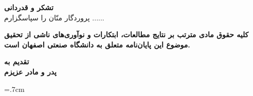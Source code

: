 \thispagestyle{empty}
\vspace*{3cm}

{\large
	\textbf{تشکر و قدردانی}\\

	
پروردگار منّان را سپاسگزارم ......

}
\restoregeometry
\pagebreak

\thispagestyle{empty}

\begin{spacing}{3}
	\leavevmode
	\vfill
	\parbox{8 cm}{
		
		\textbf{\Large کلیه حقوق مادی مترتب بر نتایج مطالعات، ابتکارات و نوآوری‌های ناشی از تحقیق موضوع این پایان‌نامه متعلق به دانشگاه صنعتی اصفهان است.}
		
	}
	\vfill
\end{spacing}
\restoregeometry
\pagebreak

\thispagestyle{empty}

{\LARGE
\centering
\textbf{تقدیم به \\ پدر و مادر عزیزم }

}
\bgroup\vspace*{\fill}
\renewcommand{\\}{\vspace{-.5em}\newline\relax}
\newcommand{\تب}[1][.5]{\hspace*{#1cm}}
\noindent

	\vspace*{\fill}\egroup
	\pagebreak




\baselineskip=.7cm

\tableofcontents
\listoffigures
\listoftables
\pagebreak

